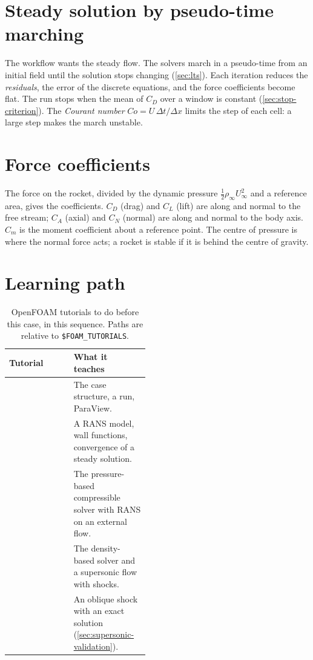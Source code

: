\section{Steady solution by pseudo-time marching}

The workflow wants the steady flow. The solvers march in a pseudo-time from an initial
field until the solution stops changing (\cref{sec:lts}). Each iteration reduces the
\emph{residuals}, the error of the discrete equations, and the force coefficients become
flat. The run stops when the mean of $C_D$ over a window is constant
(\cref{sec:stop-criterion}). The \emph{Courant number} $Co = U\,\Delta t/\Delta x$ limits
the step of each cell: a large step makes the march unstable.

\section{Force coefficients}

The force on the rocket, divided by the dynamic pressure $\tfrac12\rho_\infty U_\infty^2$
and a reference area, gives the coefficients. $C_D$ (drag) and $C_L$ (lift) are along
and normal to the free stream; $C_A$ (axial) and $C_N$ (normal) are along and normal to
the body axis. $C_m$ is the moment coefficient about a reference point. The centre of
pressure is where the normal force acts; a rocket is stable if it is behind the centre
of gravity.

\section{Learning path}

\begin{table}[htbp]
\centering
\caption{OpenFOAM tutorials to do before this case, in this sequence. Paths are relative to \texttt{\$FOAM\_TUTORIALS}.}\label{tab:tutorials}
\begin{tabularx}{\linewidth}{@{}P{0.46\linewidth} L@{}}
\toprule
Tutorial & What it teaches \\
\midrule
{} & The case structure, a run, ParaView. \\
 & A RANS model, wall functions, convergence of a steady solution. \\
 & The pressure-based compressible solver with RANS on an external flow. \\
 & The density-based solver and a supersonic flow with shocks. \\
 & An oblique shock with an exact solution (\cref{sec:supersonic-validation}). \\
\bottomrule
\end{tabularx}
\end{table}

